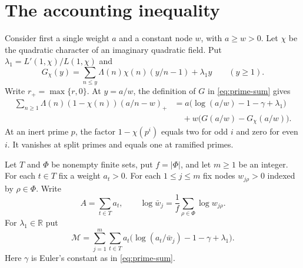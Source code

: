 \section{The accounting inequality}\label{sec:accounting}

Consider first a single weight $a$ and a constant node $w$, with
$a\ge w>0$. Let $\chi$ be the quadratic character of an imaginary
quadratic field. Put $\lambda_1=L'(1,\chi)/L(1,\chi)$ and
\[
  G_\chi(y)=\sum_{n\le y}\Lambda(n)\chi(n)(y/n-1)+\lambda_1 y
  \qquad(y\ge1).
\]
Write $r_+=\max\{r,0\}$. At $y=a/w$, the definition of $G$ in
\eqref{eq:prime-sum} gives
\begin{align*}
  \sum_{n\ge1}\Lambda(n)(1-\chi(n))(a/n-w)_+
    &=a\bigl(\log(a/w)-1-\gamma+\lambda_1\bigr)\\
    &\quad+w\bigl(G(a/w)-G_\chi(a/w)\bigr).
\end{align*}
At an inert prime $p$, the factor $1-\chi(p^i)$ equals two for odd $i$
and zero for even $i$. It vanishes at split primes and equals one at
ramified primes.

Let $T$ and $\Phi$ be nonempty finite sets, put $f=|\Phi|$, and let
$m\ge1$ be an integer. For each $t\in T$ fix a weight $a_t>0$.
For each $1\le j\le m$ fix nodes $w_{j\rho}>0$ indexed by $\rho\in\Phi$.
Write
\[
  A=\sum_{t\in T}a_t,\qquad
  \log\bar w_j=\frac1f\sum_{\rho\in\Phi}\log w_{j\rho}.
\]
For $\lambda_1\in\mathbb R$ put
\begin{equation}\label{eq:account-main}
  \mathcal M=\sum_{j=1}^m\sum_{t\in T}
    a_t\bigl(\log(a_t/\bar w_j)-1-\gamma+\lambda_1\bigr).
\end{equation}
Here $\gamma$ is Euler's constant as in \eqref{eq:prime-sum}.

